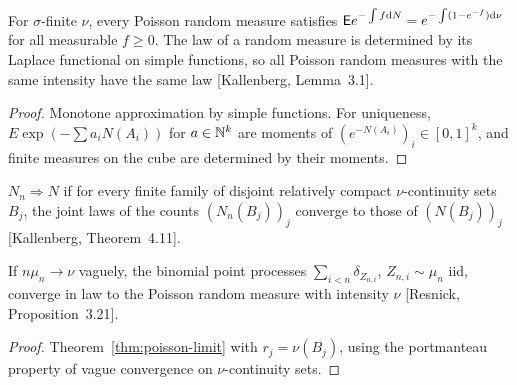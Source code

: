 \begin{theorem}
  \label{thm:prm-uniqueness}
  \leanok
  For $\sigma$-finite $\nu$, every Poisson random measure satisfies
  $\mathsf{E} e^{-\int f \mathrm{d} N} = e^{-\int (1 - e^{-f}) \mathrm{d}\nu}$ for all measurable $f \ge 0$. The law of a
  random measure is determined by its Laplace functional on simple functions, so all Poisson random
  measures with the same intensity have the same law [Kallenberg, Lemma~3.1].
\end{theorem}
\begin{proof}
  \leanok
  Monotone approximation by simple functions. For uniqueness, $E \exp(-\sum a_i N(A_i))$ for
  $a \in \mathbb{N}^k$ are moments of $(e^{-N(A_i)})_i \in [0,1]^k$, and finite measures on the cube are
  determined by their moments.
\end{proof}

\begin{definition}
  \label{def:tendsto-in-law-vaguely}
  \leanok
  $N_n \Rightarrow N$ if for every finite family of disjoint relatively compact $\nu$-continuity sets
  $B_j$, the joint laws of the counts $(N_n(B_j))_j$ converge to those of $(N(B_j))_j$
  [Kallenberg, Theorem~4.11].
\end{definition}

\begin{theorem}
  \label{thm:binomial-to-prm}
  \leanok
  If $n\mu_n \to \nu$ vaguely, the binomial point processes $\sum_{i<n} \delta_{Z_{n,i}}$,
  $Z_{n,i} \sim \mu_n$ iid, converge in law to the Poisson random measure with intensity $\nu$
  [Resnick, Proposition~3.21].
\end{theorem}
\begin{proof}
  \leanok
  Theorem~\ref{thm:poisson-limit} with $r_j = \nu(B_j)$, using the portmanteau property of vague
  convergence on $\nu$-continuity sets.
\end{proof}

